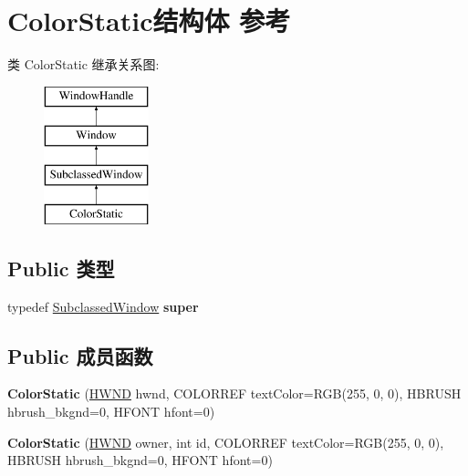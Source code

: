 \hypertarget{struct_color_static}{}\section{Color\+Static结构体 参考}
\label{struct_color_static}
类 Color\+Static 继承关系图\+:\begin{figure}[H]
\begin{center}
\leavevmode
\includegraphics[height=4.000000cm]{struct_color_static}
\end{center}
\end{figure}
\subsection*{Public 类型}
\begin{DoxyCompactItemize}
\item 
\mbox{\label{struct_color_static_aeb3ff95a5ca2beec49def2e35e1af07a}} 
typedef \hyperlink{struct_subclassed_window}{Subclassed\+Window} {\bfseries super}
\end{DoxyCompactItemize}
\subsection*{Public 成员函数}
\begin{DoxyCompactItemize}
\item 
\mbox{\label{struct_color_static_a63482f16731e38319799f6c64e8268d7}} 
{\bfseries Color\+Static} (\hyperlink{interfacevoid}{H\+W\+ND} hwnd, C\+O\+L\+O\+R\+R\+EF text\+Color=R\+GB(255, 0, 0), H\+B\+R\+U\+SH hbrush\+\_\+bkgnd=0, H\+F\+O\+NT hfont=0)
\item 
\mbox{\label{struct_color_static_a8cad291bc9545f33c64f66d4ff851f40}} 
{\bfseries Color\+Static} (\hyperlink{interfacevoid}{H\+W\+ND} owner, int id, C\+O\+L\+O\+R\+R\+EF text\+Color=R\+GB(255, 0, 0), H\+B\+R\+U\+SH hbrush\+\_\+bkgnd=0, H\+F\+O\+NT hfont=0)
\end{DoxyCompactItemize}
